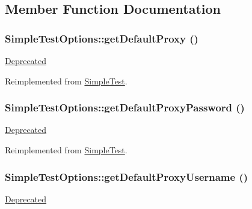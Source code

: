 \subsection{Member Function Documentation}
\hypertarget{class_simple_test_options_abc355e97139c010dce4d0fbe181a1cfe}{
\subsubsection[{getDefaultProxy}]{\setlength{\rightskip}{0pt plus 5cm}SimpleTestOptions::getDefaultProxy ()}}
\label{class_simple_test_options_abc355e97139c010dce4d0fbe181a1cfe}
\begin{Desc}
\item[\hyperlink{deprecated__deprecated000014}{Deprecated}]\end{Desc}


Reimplemented from \hyperlink{class_simple_test_ad365479a7b328142767560e440f1f2c0}{SimpleTest}.\hypertarget{class_simple_test_options_ac0c29d1f79a425dc7053d9269b63f1f6}{
\subsubsection[{getDefaultProxyPassword}]{\setlength{\rightskip}{0pt plus 5cm}SimpleTestOptions::getDefaultProxyPassword ()}}
\label{class_simple_test_options_ac0c29d1f79a425dc7053d9269b63f1f6}
\begin{Desc}
\item[\hyperlink{deprecated__deprecated000016}{Deprecated}]\end{Desc}


Reimplemented from \hyperlink{class_simple_test_a2624d0e6c9d79700b03600fca215e642}{SimpleTest}.\hypertarget{class_simple_test_options_a5f3b3d362318bcc9fb3da67c25229dde}{
\subsubsection[{getDefaultProxyUsername}]{\setlength{\rightskip}{0pt plus 5cm}SimpleTestOptions::getDefaultProxyUsername ()}}
\label{class_simple_test_options_a5f3b3d362318bcc9fb3da67c25229dde}
\begin{Desc}
\item[\hyperlink{deprecated__deprecated000015}{Deprecated}]\end{Desc}


